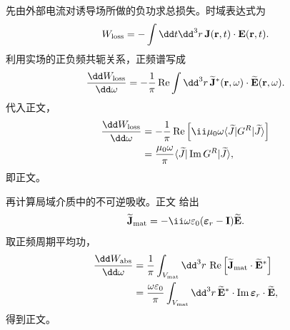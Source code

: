 \begin{derivation}

先由外部电流对诱导场所做的负功求总损失。时域表达式为
\begin{equation*}
 W_{\rm loss}
 =-\int\dd t\dd^3 r\,
 \mathbf J(\mathbf r,t)\cdot\mathbf E(\mathbf r,t).
\end{equation*}
利用实场的正负频共轭关系，正频谱写成
\begin{equation*}
 \frac{\dd W_{\rm loss}}{\dd\omega}
 =-\frac1\pi\operatorname{Re}
 \int\dd^3 r\,
 \widetilde{\mathbf J}^{*}(\mathbf r,\omega)
 \cdot\widetilde{\mathbf E}(\mathbf r,\omega).
\end{equation*}
代入正文，
\begin{align*}
 \frac{\dd W_{\rm loss}}{\dd\omega}
 &=-\frac1\pi\operatorname{Re}
 \left[\ii\mu_0\omega
 \langle\widetilde J|G^R|\widetilde J\rangle\right]\\
 &=\frac{\mu_0\omega}{\pi}
 \langle\widetilde J|\operatorname{Im}G^R|\widetilde J\rangle,
\end{align*}
即正文。

再计算局域介质中的不可逆吸收。正文 给出
\begin{equation*}
 \widetilde{\mathbf J}_{\rm mat}
 =-\ii\omega\varepsilon_0
 (\boldsymbol\varepsilon_r-\mathbf I)\widetilde{\mathbf E}.
\end{equation*}
取正频周期平均功，
\begin{align*}
 \frac{\dd W_{\rm abs}}{\dd\omega}
 &=\frac1\pi\int_{V_{\rm mat}}\dd^3 r\,
 \operatorname{Re}
 \left[\widetilde{\mathbf J}_{\rm mat}\cdot
 \widetilde{\mathbf E}^{*}\right]\\
 &=\frac{\omega\varepsilon_0}{\pi}
 \int_{V_{\rm mat}}\dd^3 r\,
 \widetilde{\mathbf E}^{*}\cdot
 \operatorname{Im}\boldsymbol\varepsilon_r
 \cdot\widetilde{\mathbf E},
\end{align*}
得到正文。


\end{derivation}
